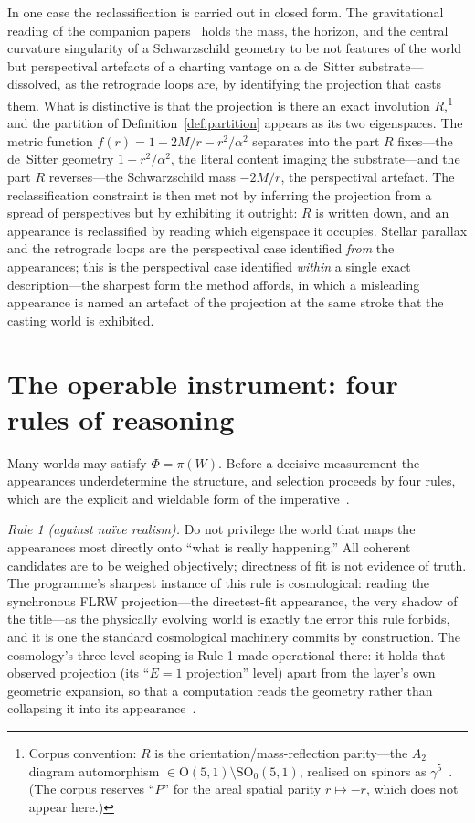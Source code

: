 \documentclass[11pt,a4paper]{article}
\begin{document}
\medskip
\noindent In one case the reclassification is carried out in closed form. The gravitational reading of the companion papers~\cite{JanzenSlicing, JanzenGroupoid, JanzenBHcausality, JanzenCircle} holds the mass, the horizon, and the central curvature singularity of a Schwarzschild geometry to be not features of the world but perspectival artefacts of a charting vantage on a de~Sitter substrate---dissolved, as the retrograde loops are, by identifying the projection that casts them. What is distinctive is that the projection is there an exact involution $R$,\footnote{Corpus convention: $R$ is the orientation/mass-reflection parity---the $A_2$ diagram automorphism $\in\mathrm{O}(5,1)\setminus\mathrm{SO}_0(5,1)$, realised on spinors as $\gamma^5$~\cite{JanzenGroupoid}. (The corpus reserves ``$P$'' for the areal spatial parity $r\mapsto-r$, which does not appear here.)} and the partition of Definition~\ref{def:partition} appears as its two eigenspaces. The metric function $f(r)=1-2M/r-r^{2}/\alpha^{2}$ separates into the part $R$ fixes---the de~Sitter geometry $1-r^{2}/\alpha^{2}$, the literal content imaging the substrate---and the part $R$ reverses---the Schwarzschild mass $-2M/r$, the perspectival artefact. The reclassification constraint is then met not by inferring the projection from a spread of perspectives but by exhibiting it outright: $R$ is written down, and an appearance is reclassified by reading which eigenspace it occupies. Stellar parallax and the retrograde loops are the perspectival case identified \emph{from} the appearances; this is the perspectival case identified \emph{within} a single exact description---the sharpest form the method affords, in which a misleading appearance is named an artefact of the projection at the same stroke that the casting world is exhibited.

\section{The operable instrument: four rules of reasoning}\label{sec:rules}

Many worlds may satisfy $\Phi=\pi(W)$. Before a decisive measurement the appearances underdetermine the structure, and selection proceeds by four rules, which are the explicit and wieldable form of the imperative~\cite{JanzenShadowReading, JanzenFortress}.

\emph{Rule 1 (against naïve realism).} Do not privilege the world that maps the appearances most directly onto ``what is really happening.'' All coherent candidates are to be weighed objectively; directness of fit is not evidence of truth. The programme's sharpest instance of this rule is cosmological: reading the synchronous FLRW projection---the directest-fit appearance, the very shadow of the title---as the physically evolving world is exactly the error this rule forbids, and it is one the standard cosmological machinery commits by construction. The cosmology's three-level scoping is Rule 1 made operational there: it holds that observed projection (its ``$E=1$ projection'' level) apart from the layer's own geometric expansion, so that a computation reads the geometry rather than collapsing it into its appearance~\cite{JanzenCosmogenesis}.
\end{document}
